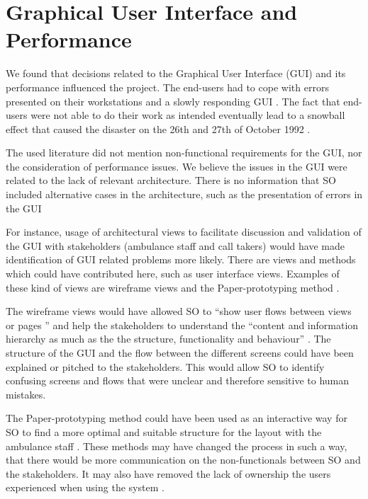 \section*{Graphical User Interface and Performance}

We found that decisions related to the Graphical User Interface (GUI) and its performance influenced the project.
The end-users had to cope with errors presented on their workstations \autocite[704]{beynon1999human} and a slowly responding GUI \autocite[3126]{officialreport}.
The fact that end-users were not able to do their work as intended eventually lead to a snowball effect that caused the disaster on the 26th and 27th of October 1992 \autocite[1017w]{officialreport}.

The used literature did not mention non-functional requirements for the GUI, nor the consideration of performance issues.
We believe the issues in the GUI were related to the lack of relevant architecture.
There is no information that SO included alternative cases in the architecture, such as the presentation of errors in the GUI

For instance, usage of architectural views to facilitate discussion and validation of the GUI with stakeholders (ambulance staff and call takers) would have made identification of GUI related problems more likely.
There are views and methods which could have contributed here, such as user interface views.
Examples of these kind of views are wireframe views and the Paper-prototyping method \autocite{uxpin}\autocite{snyder2003paper}.

The wireframe views would have allowed SO to ``show user flows between views or pages \autocite[7]{uxpin}'' and help the stakeholders to understand the
``content and information hierarchy as much as the the structure, functionality and behaviour'' \autocite[9]{uxpin}.
The structure of the GUI and the flow between the different screens could have been explained or pitched to the stakeholders. This would allow SO to identify confusing screens and flows that were unclear and therefore sensitive to human mistakes.

The Paper-prototyping method could have been used as an interactive way for SO to find a more optimal and suitable structure for the layout with the ambulance staff \autocite[345]{snyder2003paper}.
These methods may have changed the process in such a way, that there would be more communication on the non-functionals between SO and the stakeholders.
It may also have removed the lack of ownership the users experienced when using the system \autocite[1007o]{officialreport}.

